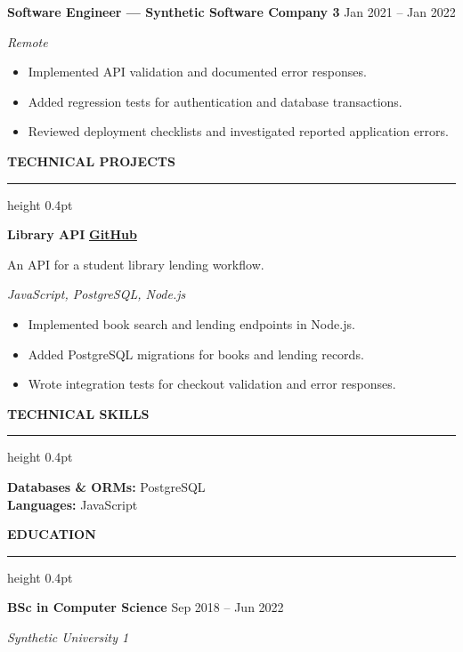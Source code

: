 \documentclass[10pt,a4paper]{article}
\newcommand{\atsSectionToSection}{9pt}
\newcommand{\atsHeadingToContent}{3pt}
\newcommand{\atsEntryToEntry}{5pt}
\newcommand{\atsProjectTitleToTech}{1.5pt}
\newcommand{\atsProjectTechToBullets}{2.5pt}
\newcommand{\atsRoleToMetadata}{1.5pt}
\newcommand{\atsMetadataToBullets}{2.5pt}
\newcommand{\atsBulletToBullet}{1.2pt}
\newcommand{\atssection}[1]{%
  \vspace{\atsSectionToSection}%
  {\noindent\large\bfseries\uppercase{#1}}\par
  \vspace{1.5pt}\hrule height 0.4pt\vspace{\atsHeadingToContent}%
}
\begin{document}
\vspace{\atsEntryToEntry}
\textbf{Software Engineer — Synthetic Software Company 3} \hfill Jan 2021 -- Jan 2022\par
\vspace{\atsRoleToMetadata}
{\small\textit{Remote}}\par
\vspace{\atsMetadataToBullets}
\begin{itemize}
\setlength{\itemsep}{\atsBulletToBullet}\setlength{\parskip}{0pt}\setlength{\parsep}{0pt}\setlength{\topsep}{0pt}\setlength{\partopsep}{0pt}
  \item Implemented API validation and documented error responses.
  \item Added regression tests for authentication and database transactions.
  \item Reviewed deployment checklists and investigated reported application errors.
\end{itemize}

\atssection{Technical Projects}
\textbf{Library API} \hfill {\small \href{https://github.com/synthetic-fixture/project-1}{\textbf{GitHub}}}\par
An API for a student library lending workflow.\par
\vspace{\atsProjectTitleToTech}
{\textit{JavaScript, PostgreSQL, Node.js}}\par
\vspace{\atsProjectTechToBullets}
\begin{itemize}
\setlength{\itemsep}{\atsBulletToBullet}\setlength{\parskip}{0pt}\setlength{\parsep}{0pt}\setlength{\topsep}{0pt}\setlength{\partopsep}{0pt}
  \item Implemented book search and lending endpoints in Node.js.
  \item Added PostgreSQL migrations for books and lending records.
  \item Wrote integration tests for checkout validation and error responses.
\end{itemize}

\atssection{Technical Skills}
\textbf{Databases \& ORMs:} PostgreSQL\\
\textbf{Languages:} JavaScript\par

\atssection{Education}
\textbf{BSc in Computer Science} \hfill Sep 2018 -- Jun 2022\par
\vspace{\atsRoleToMetadata}
{\small\textit{Synthetic University 1}}\par
\end{document}
